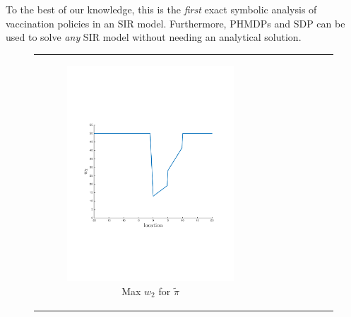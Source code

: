 \documentclass[letterpaper]{article}
\begin{document}
To the best of our knowledge, this is the \textit{first} exact symbolic analysis of vaccination policies in an SIR model. Furthermore, PHMDPs and SDP can be used to solve \textit{any} SIR model without needing an analytical solution.

{\centering
    \begin{figure}[]
        \begin{tabular}{cc}
            \begin{subfigure}{0.45\columnwidth}
                \centering
                \includegraphics[width=\columnwidth,height=0.12\textheight]{images/robot_opt_new}
                \caption{Max {\footnotesize $w_2$} for $ \tilde{\pi} $}
                \label{fig:navigation_opt}
            \end{subfigure} &            
            \begin{subfigure}{0.45\columnwidth}
                \centering

\end{subfigure}
\end{tabular}
\end{figure}}
\end{document}
